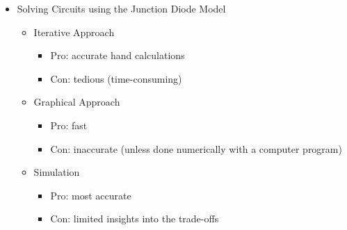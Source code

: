\begin{itemize}
  \item Solving Circuits using the Junction Diode Model

    \begin{itemize}

      \item Iterative Approach

        \begin{itemize}

          \item Pro: accurate hand calculations

          \item Con: tedious (time-consuming)

        \end{itemize}

      \item Graphical Approach

        \begin{itemize}

          \item Pro: fast

          \item Con: inaccurate (unless done numerically with a computer program)

        \end{itemize}

      \item Simulation

        \begin{itemize}

          \item Pro: most accurate

          \item Con: limited insights into the trade-offs

        \end{itemize}

    \end{itemize}

\end{itemize}



